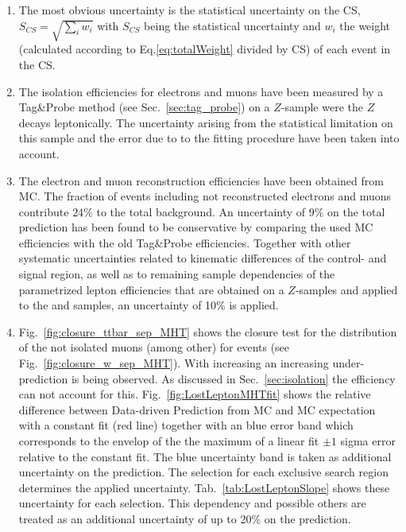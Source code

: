 \begin{enumerate}
 \item The most obvious uncertainty is the statistical uncertainty on the CS, $S_{CS}=\sqrt{\sum_i{w_i}}$ with $S_{CS}$ being the statistical uncertainty and $w_i$ the weight (calculated according to Eq.\ref{eq:totalWeight} divided by CS) of each event in the CS. 

 \item The isolation efficiencies for electrons and muons have been measured by a Tag\&Probe method (see Sec.~\ref{sec:tag_probe}) on a $Z$-sample were the $Z$ decays leptonically. The uncertainty arising from the statistical limitation on this sample and the error due to to the fitting procedure have been taken into account.

 \item
 The electron and muon reconstruction efficiencies have been obtained from MC. The fraction of events including not reconstructed electrons and muons contribute $24\%$ to the total background. An  uncertainty of $9\%$ on the total prediction has been found to be conservative by comparing the used MC efficiencies with the old Tag\&Probe efficiencies. Together with other systematic uncertainties related to kinematic differences of the control- and signal region, as well as to remaining sample dependencies of the parametrized lepton efficiencies that are obtained on a $Z$-samples and applied to the \ttbar and \wpj samples, an uncertainty of 10\% is applied. 

 \item Fig.~\ref{fig:closure_ttbar_sep_MHT} shows the closure test for the \MHT distribution of the not isolated muons (among other) for \ttbar events (\wpj see Fig.~\ref{fig:closure_w_sep_MHT}). With increasing \MHT an increasing under-prediction is being observed. As discussed in Sec.~\ref{sec:isolation} the efficiency can not account for this. Fig.~\ref{fig:LostLeptonMHTfit} shows the relative difference between Data-driven Prediction from MC and MC expectation with a constant fit (red line) together with an blue error band which corresponds to the envelop of the the maximum of a linear fit $\pm1$ sigma error relative to the constant fit. The blue uncertainty band is taken as additional uncertainty on the prediction. The \MHT selection for each exclusive search region determines the applied uncertainty. Tab.~\ref{tab:LostLeptonSlope} shows these uncertainty for each \MHT selection. 
This \MHT dependency and possible others are treated as an additional uncertainty of up to 20\% on the prediction. 


\end{enumerate}
